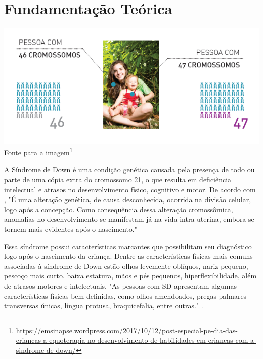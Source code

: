 \chapter{Fundamentação Teórica}\label{chp:rev}



\begin{center}
    \includegraphics[width=1\linewidth]{figuras/sindrome de down.png}
    \label{fig:Cromossomos Comparativo pessoa normal e com sindrome de down}
    Fonte para a imagem\footnote{\url{https://emsinapse.wordpress.com/2017/10/12/post-especial-pe-dia-das-criancas-a-equoterapia-no-desenvolvimento-de-habilidades-em-criancas-com-a-sindrome-de-down/}}
\end{center}


A Síndrome de Down é uma condição genética causada pela presença de todo ou parte de uma cópia extra do cromossomo 21, o que resulta em deficiência intelectual e atrasos no desenvolvimento físico, cognitivo e motor. De acordo com \cite{schwartzman2003sindrome}, "É uma alteração genética, de causa desconhecida, ocorrida na divisão celular, logo após a concepção. Como consequência dessa alteração cromossômica, anomalias no desenvolvimento se manifestam já na vida intra-uterina, embora se tornem mais evidentes após o nascimento."

Essa síndrome possui características marcantes que possibilitam seu diagnóstico logo após o nascimento da criança. Dentre as características físicas mais comuns associadas à síndrome de Down estão olhos levemente oblíquos, nariz pequeno, pescoço mais curto, baixa estatura, mãos e pés pequenos, hiperflexibilidade, além de atrasos motores e intelectuais. "As pessoas com SD apresentam algumas características físicas bem definidas, como olhos amendoados, pregas palmares transversas únicas, língua protusa, braquicefalia, entre outras." \cite{coelho2016sindrome}.

